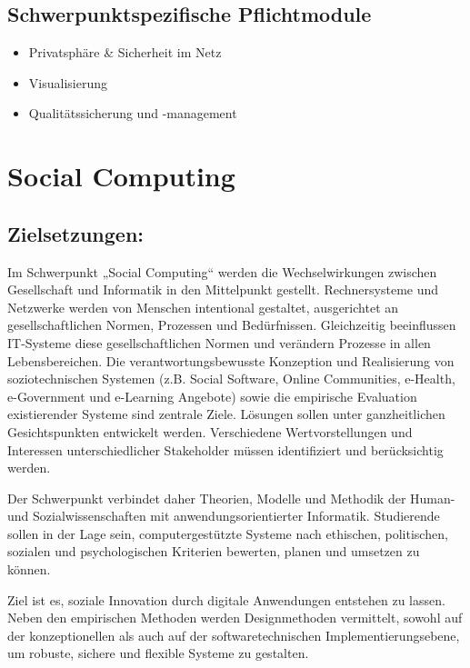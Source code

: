 \section*{Schwerpunktspezifische
Pflichtmodule}\label{schwerpunktspezifische-pflichtmodule-1}

\begin{itemize}
\tightlist
\item
  Privatsphäre \& Sicherheit im Netz
\item
  Visualisierung
\item
  Qualitätssicherung und -management
\end{itemize}

\chapter{Social Computing}\label{social-computing}

\section*{Zielsetzungen:}\label{zielsetzungen-1}

Im Schwerpunkt „Social Computing`` werden die Wechselwirkungen zwischen
Gesellschaft und Informatik in den Mittelpunkt gestellt. Rechnersysteme
und Netzwerke werden von Menschen intentional gestaltet, ausgerichtet an
gesellschaftlichen Normen, Prozessen und Bedürfnissen. Gleichzeitig
beeinflussen IT-Systeme diese gesellschaftlichen Normen und verändern
Prozesse in allen Lebensbereichen. Die verantwortungsbewusste Konzeption
und Realisierung von soziotechnischen Systemen (z.B. Social Software,
Online Communities, e-Health, e-Government und e-Learning Angebote)
sowie die empirische Evaluation existierender Systeme sind zentrale
Ziele. Lösungen sollen unter ganzheitlichen Gesichtspunkten entwickelt
werden. Verschiedene Wertvorstellungen und Interessen unterschiedlicher
Stakeholder müssen identifiziert und berücksichtig werden.

Der Schwerpunkt verbindet daher Theorien, Modelle und Methodik der
Human- und Sozialwissenschaften mit anwendungsorientierter Informatik.
Studierende sollen in der Lage sein, computergestützte Systeme nach
ethischen, politischen, sozialen und psychologischen Kriterien bewerten,
planen und umsetzen zu können.

Ziel ist es, soziale Innovation durch digitale Anwendungen entstehen zu
lassen. Neben den empirischen Methoden werden Designmethoden vermittelt,
sowohl auf der konzeptionellen als auch auf der softwaretechnischen
Implementierungsebene, um robuste, sichere und flexible Systeme zu
gestalten.

